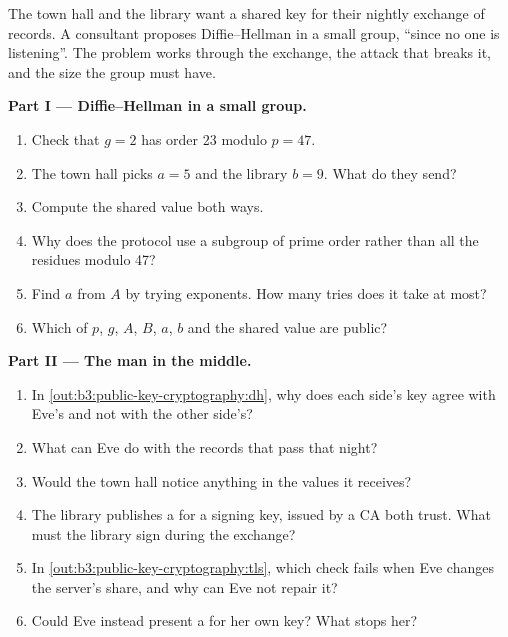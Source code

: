 \begin{problem}\label{pb:b3:public-key-cryptography:1}
The town hall and the library want a shared key for their nightly exchange of records. A consultant proposes Diffie--Hellman in a small group, ``since no one is listening''. The problem works through the exchange, the attack that breaks it, and the size the group must have.

\medskip\noindent\textbf{Part I --- Diffie--Hellman in a small group.}
\begin{enumerate}
  \item Check that $g = 2$ has order 23 modulo $p = 47$.
  \item The town hall picks $a = 5$ and the library $b = 9$. What do they send?
  \item Compute the shared value both ways.
  \item Why does the protocol use a subgroup of prime order rather than all the residues modulo 47?
  \item Find $a$ from $A$ by trying exponents. How many tries does it take at most?
  \item Which of $p$, $g$, $A$, $B$, $a$, $b$ and the shared value are public?
\end{enumerate}

\medskip\noindent\textbf{Part II --- The man in the middle.}
\begin{enumerate}[resume]
  \item In \cref{out:b3:public-key-cryptography:dh}, why does each side's key agree with Eve's and not with the other side's?
  \item What can Eve do with the records that pass that night?
  \item Would the town hall notice anything in the values it receives?
  \item The library publishes a  for a signing key, issued by a CA both trust. What must the library sign during the exchange?
  \item In \cref{out:b3:public-key-cryptography:tls}, which check fails when Eve changes the server's share, and why can Eve not repair it?
  \item Could Eve instead present a  for her own key? What stops her?
\end{enumerate}


\end{problem}
